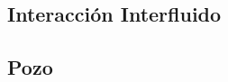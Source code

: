 \subsection{Interacción Interfluido}\label{sec:PS_Interphase}

\subsection{Pozo}\label{sec:PS_Well}



